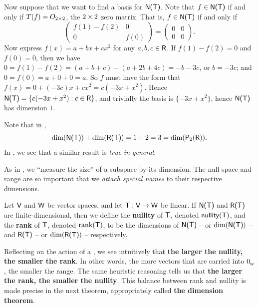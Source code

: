 \begin{example}
Now suppose that we want to find a basis for \(\textsf{N(T)}\).
Note that \(f \in \textsf{N(T)}\) if and only if \(T(f) = O_{2 \times 2}\), the \(2 \times 2\) zero matrix.
That is, \(f \in \textsf{N(T)}\) if and only if
\[
    \begin{pmatrix}
        f(1) - f(2) & 0 \\
        0 & f(0)
    \end{pmatrix}
    = \begin{pmatrix}
        0 & 0 \\
        0 & 0
    \end{pmatrix}.
\]
Now express \(f(x) = a + bx + cx^2\) for any \(a, b, c \in \textsf{R}\).
If \(f(1) - f(2) = 0\) and \(f(0) = 0\), then we have \(0 = f(1) - f(2) = (a + b + c) - (a + 2b + 4c) = -b - 3c\), or \(b = -3c\);
and \(0 = f(0) = a + 0 + 0 = a\).
So \(f\) must have the form that \(f(x) = 0 + (-3c) x + c x^2 = c(-3x + x^2)\).
Hence \(\textsf{N(T)} = \{ c(-3x + x^2) : c \in \textsf{R} \}\), and trivially the basis is \(\{ -3x + x^2 \}\), hence \(\textsf{N(T)}\) has dimension \(1\).
\end{example}

\begin{remark} \label{remark 2.1.6}
Note that in ,
\[
    \dim(\textsf{N(T)}) + \dim(\textsf{R(T)}) = 1 + 2 = 3 = \dim(\textsf{P}_2(\textsf{R})).
\]
In , we see that a similar result is \emph{true in general}.
\end{remark}

As in , we ``measure the size'' of a subspace by its dimension.
The null space and range are so important that we \emph{attach special names} to their respective dimensions.

\begin{definition} \label{def 2.3}
Let \(\textsf{V}\) and \(\textsf{W}\) be vector spaces, and let \(\textsf{T} : \textsf{V} \to \textsf{W}\) be linear.
If \(\textsf{N(T)}\) and \(\textsf{R(T)}\) are finite-dimensional, then we define the \textbf{nullity} of \(\textsf{T}\), denoted \(\textsf{nullity}(\textsf{T})\), and the \textbf{rank} of \(\textsf{T}\), denoted \(\mathrm{rank}(\textsf{T})\),
to be the dimensions of \(\textsf{N(T)}\) -- or \(\dim(\textsf{N(T)})\) -- and \(\textsf{R(T)}\) -- or \(\dim(\textsf{R(T)})\) -- respectively.
\end{definition}

\begin{remark} \label{remark 2.1.7}
Reflecting on the action of a \LTRAN{}, we see intuitively that \textbf{the larger the nullity, the smaller the rank}.
In other words, the more vectors that are carried into \(0_{_{\textsf{W}}}\), the smaller the range.
The same heuristic reasoning tells us that \textbf{the larger the rank, the smaller the nullity}.
This balance between rank and nullity is made precise in the next theorem, appropriately called \textbf{the dimension theorem}.
\end{remark}

